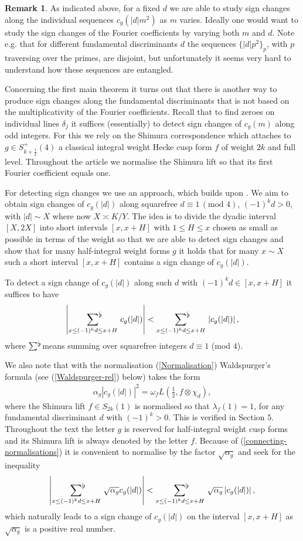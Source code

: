 \documentclass[a4paper,10pt,twoside]{amsart}
\theoremstyle{definition}
\newtheorem{rem}[theorem]{Remark}
\numberwithin{equation}{section}
\renewcommand\:{\colon}
\newcommand{\sumflat}{\mathop{{\sum}^{\raisebox{-3pt}{\makebox[0pt][l]{$\flat$}}}}}
\begin{document}
\begin{rem}
As indicated above, for a fixed $d$ we are able to study sign changes along the individual sequences $c_g(|d|m^2)$ as $m$ varies. Ideally one would want to study the sign changes of the Fourier coefficients by varying both $m$ and $d$. Note e.g. that for different fundamental discriminants $d$ the sequences $\{|d|p^2\}_p$, with $p$ traversing over the primes, are disjoint, but unfortunately it seems very hard to understand how these sequences are entangled. 
\end{rem}
\noindent Concerning the first main theorem it turns out that there is another way to produce sign changes along the fundamental discriminants that is not based on the multiplicativity of the Fourier coefficients. Recall that to find zeroes on individual lines $\delta_j$ it suffices (essentially) to detect sign changes of $c_g(m)$ along odd integers. For this we rely on the Shimura correspondence which attaches to $g\in S^+_{k+\frac12}(4)$ a classical integral weight Hecke cusp form $f$ of weight $2k$ and full level. Throughout the article we normalise the Shimura lift so that its first Fourier coefficient equals one.

For detecting sign changes we use an approach, which builds upon \cite{Matomaki-Radziwill2015, Lester-Radziwill2021}. We aim to obtain sign changes of $c_g(|d|)$ along squarefree $d\equiv 1\,(\text{mod }4)$, $(-1)^kd>0$, with $|d|\sim X$ where now $X\asymp K/Y$. The idea is to divide the dyadic interval $[X,2X]$ into short intervals $[x,x+H]$ with $1\leq H\leq x$ chosen as small as possible in terms of the weight so that we are able to detect sign changes and show that for many half-integral weight forms $g$ it holds that for many $x\sim X$ such a short interval $[x,x+H]$ contains a sign change of $c_g(|d|)$. 

To detect a sign change of $c_g(|d|)$ along such $d$ with $(-1)^kd\in[x,x+H]$ it suffices to have
\[\left|\sumflat_{x\leq (-1)^kd\leq x+H}\,c_g(|d|)\right|<\sumflat_{x\leq (-1)^kd\leq x+H}\,\left|c_g(|d|)\right|,\]
where $\sumflat\,$ means summing over squarefree integers $d\equiv 1$ (mod $4$).

We also note that with the normalisation (\ref{Normalisation}) Waldspurger's formula (see (\ref{Waldspurger-rel}) below) takes the form
\begin{align}\label{connecting-normalisations}
\alpha_g|c_g(|d|)|^2=\omega_fL\left(\frac12,f\otimes\chi_d\right),
\end{align}
where the Shimura lift $f\in S_{2k}(1)$ is normalised so that $\lambda_f(1)=1$, for any fundamental discriminant $d$ with $(-1)^k>0$. This is verified in Section $5$. Throughout the text the letter $g$ is reserved for half-integral weight cusp forms and its Shimura lift is always denoted by the letter $f$. Because of (\ref{connecting-normalisations}) it is convenient to normalise by the factor $\sqrt{\alpha_g}$ and seek for the inequality 
\[\left|\sumflat_{x\leq (-1)^kd\leq x+H}\,\sqrt{\alpha_g}c_g(|d|)\right|<\sumflat_{x\leq (-1)^kd\leq x+H}\,\sqrt{\alpha_g}\left|c_g(|d|)\right|,\]
which naturally leads to a sign change of $c_g(|d|)$ on the interval $[x,x+H]$ as $\sqrt{\alpha_g}$ is a positive real number. 
\end{document}
